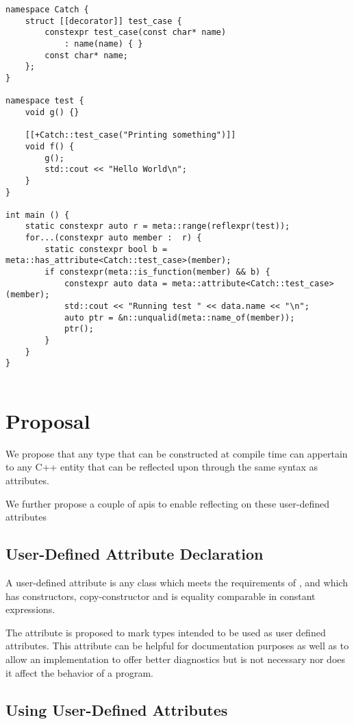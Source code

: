 \documentclass{wg21}
\begin{document}
\begin{verbatim}
namespace Catch {
    struct [[decorator]] test_case {
        constexpr test_case(const char* name)
            : name(name) { }
        const char* name;
    };
}

namespace test {
    void g() {}

    [[+Catch::test_case("Printing something")]]
    void f() {
        g();
        std::cout << "Hello World\n";
    }
}

int main () {
    static constexpr auto r = meta::range(reflexpr(test));
    for...(constexpr auto member :  r) {
        static constexpr bool b = meta::has_attribute<Catch::test_case>(member);
        if constexpr(meta::is_function(member) && b) {
            constexpr auto data = meta::attribute<Catch::test_case>(member);
            std::cout << "Running test " << data.name << "\n";
            auto ptr = &n::unqualid(meta::name_of(member));
            ptr();
        }
    }
}


\end{verbatim}

\section{Proposal}

We propose that any  type that can be constructed at compile time can appertain to any C++ entity that can be reflected upon through the same syntax as attributes.

We further propose a couple of apis to enable reflecting on these user-defined attributes

\subsection{User-Defined Attribute Declaration}

A user-defined attribute is any class which meets the requirements of , and which has 
constructors, copy-constructor and is equality comparable in constant expressions.

The \tcode{[[decorator]]} attribute is proposed to mark types intended to be used as user defined attributes.
This attribute can be helpful for documentation purposes as well as to allow an implementation to offer better diagnostics but is not necessary nor does it affect the behavior of a program.

\subsection{Using User-Defined Attributes}
\end{document}
